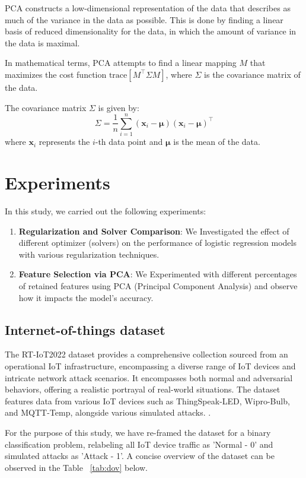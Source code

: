 \documentclass[a4paper,10pt,twocolumn]{article}
\begin{document}
PCA constructs a low-dimensional representation of the data that describes as much of the variance in the data as possible. This is done by finding a linear basis of reduced dimensionality for the data, in which the amount of variance in the data is maximal.

In mathematical terms, PCA attempts to find a linear mapping $M$ that maximizes the cost function $\text{trace}[M^\top \Sigma M]$, where $\Sigma$ is the covariance matrix of the data.

The covariance matrix $\Sigma$ is given by:
\[
\Sigma = \frac{1}{n} \sum_{i=1}^{n} (\mathbf{x}_i - \mathbf{\mu})(\mathbf{x}_i - \mathbf{\mu})^\top
\]
where $\mathbf{x}_i$ represents the $i$-th data point and $\mathbf{\mu}$ is the mean of the data.

\cite{maaten2009}

\section{Experiments}

In this study, we carried out the following experiments:

\begin{enumerate}
    \item \textbf{Regularization and Solver Comparison}: We Investigated the effect of different optimizer (solvers) on the performance of logistic regression models with various regularization techniques.
    \item \textbf{Feature Selection via PCA}: We Experimented with different percentages of retained features using PCA (Principal Component Analysis) and observe how it impacts the model's accuracy.
\end{enumerate}

\subsection{Internet-of-things dataset}

The RT-IoT2022 dataset provides a comprehensive collection sourced from an operational IoT infrastructure, encompassing a diverse range of IoT devices and intricate network attack scenarios. It encompasses both normal and adversarial behaviors, offering a realistic portrayal of real-world situations. The dataset features data from various IoT devices such as ThingSpeak-LED, Wipro-Bulb, and MQTT-Temp, alongside various simulated attacks. \cite{misc_rt-iot2022__942}.

For the purpose of this study, we have re-framed the dataset for a binary classification problem, relabeling all IoT device traffic as 'Normal - 0' and simulated attacks as 'Attack - 1'. A concise overview of the dataset can be observed in the Table ~\ref{tab:dov} below.
\end{document}

